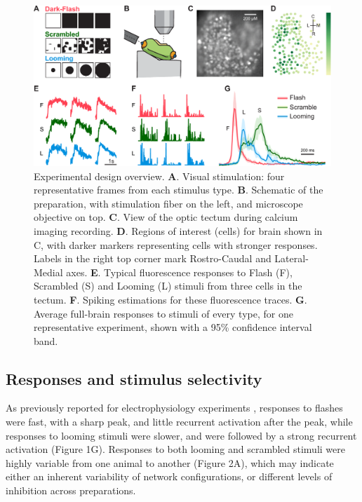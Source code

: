 \documentclass{article}
\providecommand{\DIFaddtex}[1]{{\protect\color{blue}{#1}}} %
\providecommand{\DIFaddFL}[1]{\DIFadd{#1}} %
\providecommand{\DIFaddbeginFL}{} %
\providecommand{\DIFaddendFL}{} %
\providecommand{\DIFadd}[1]{\texorpdfstring{\DIFaddtex{#1}}{#1}} %
\newcommand{\DIFaddincludegraphics}[2][]{{\color{blue}\fbox{\DIFOincludegraphics[#1]{#2}}}} %
\DeclareRobustCommand{\DIFaddbeginFL}{\DIFOaddbeginFL \let\includegraphics\DIFaddincludegraphics} %
\DeclareRobustCommand{\DIFaddendFL}{\DIFOaddendFL \let\includegraphics\DIFOincludegraphics} %
\begin{document}
\begin{figure}[t!]
\includegraphics[width=\linewidth]{fig1.pdf}
\caption{
Experimental design overview. \textbf{A}. Visual stimulation: four representative frames from each stimulus type. \textbf{B}. Schematic of the preparation, with stimulation fiber on the left, and microscope objective on top. \textbf{C}. View of the optic tectum during calcium imaging recording. \textbf{D}. Regions of interest (cells) for brain shown in C, with darker markers representing cells with stronger responses. Labels in the right top corner mark Rostro-Caudal and Lateral-Medial axes. \textbf{E}. Typical fluorescence responses to Flash (F), Scrambled (S) and Looming (L) stimuli from three cells in the tectum. \textbf{F}. Spiking estimations \DIFaddbeginFL \DIFaddFL{(via deconvolution) }\DIFaddendFL for these fluorescence traces. \textbf{G}. Average full-brain responses to stimuli of every type, for one representative experiment, shown with a 95\% confidence interval band. }
\end{figure}

\subsection*{Responses and stimulus selectivity}

As previously reported for electrophysiology experiments \citep{khakhalin2014}, responses to flashes were fast, with a sharp peak, and little recurrent activation after the peak, while responses to looming stimuli were slower, and were followed by a strong recurrent activation (Figure 1G). Responses to both looming and scrambled stimuli were highly variable from one animal to another (Figure 2A), which may indicate either an inherent variability of network configurations, or different levels of inhibition across preparations.
\end{document}
